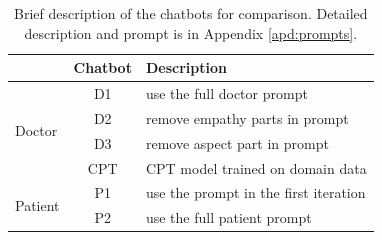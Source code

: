 \begin{table}[h]
    \centering
    \footnotesize
    \begin{tabular}{m{}|c|m{}}
    \hline
    & Chatbot & Description \\
    \hline
    \multirow{4}{0.1\columnwidth}{Doctor} & D1 & use the full doctor prompt \\
    \cline{2-3}
    & D2 & remove empathy parts in prompt  \\
    \cline{2-3}
    & D3 &  remove aspect part in prompt \\
    \cline{2-3}
    & CPT & CPT model trained on domain data \\
    \hline
    \multirow{2}{0.1\columnwidth}{Patient} & P1 & use the prompt in the first iteration \\
    \cline{2-3}
    & P2 & use the full patient prompt\\
    \hline
    \end{tabular}
    \caption{Brief description of the chatbots for comparison. Detailed description and prompt is in Appendix \ref{apd:prompts}.}
    \label{tab:cmp_chatbots}
\end{table}
